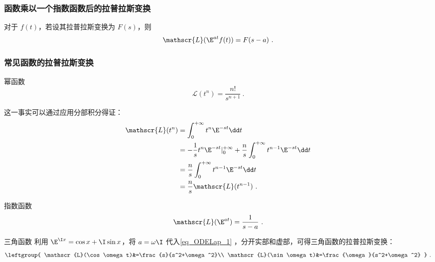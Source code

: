 \subsubsection{函数乘以一个指数函数后的拉普拉斯变换}




\begin{theorem}{}\label{the_ODELap_2}
对于 $f(t)$，若设其拉普拉斯变换为 $F(s)$，则
\begin{equation}
\mathscr{L}(\E^{at}f(t))=F(s-a)~.
\end{equation}
\end{theorem}









\subsubsection{常见函数的拉普拉斯变换}

\begin{example}{幂函数}
\begin{equation}\label{eq_ODELap_11}
\mathscr{L}(t^n)=\frac{n!}{s^{n+1}}~.
\end{equation}

这一事实可以通过应用分部积分得证：
\begin{equation}\label{eq_ODELap_2}
\begin{aligned}
\mathscr{L}(t^n)&=\int_0^{+\infty}t^n\E^{-st}\dd t\\
&=-\frac{1}{s}t^n\E^{-st}|^{+\infty}_0+\frac{n}{s}\int_0^{+\infty}t^{n-1}\E^{-st}\dd t\\
&=\frac{n}{s}\int_0^{+\infty}t^{n-1}\E^{-st}\dd t\\
&=\frac{n}{s}\mathscr{L}(t^{n-1})~.
\end{aligned}
\end{equation}
\end{example}

\begin{example}{指数函数}
\begin{equation}\label{eq_ODELap_1}
\mathscr{L}(\E^{at})=\frac{1}{s-a}~.
\end{equation}

\end{example}

\begin{example}{三角函数}
利用 $\E^{\I x}=\cos x+\I\sin x$，将 $a=\omega\I$ 代入\autoref{eq_ODELap_1} ，分开实部和虚部，可得三角函数的拉普拉斯变换：
\begin{equation}\label{eq_ODELap_3}
\leftgroup{
    \mathscr{L}(\cos \omega t)&=\frac{s}{s^2+\omega^2}\\
    \mathscr{L}(\sin \omega t)&=\frac{\omega}{s^2+\omega^2}
}~.
\end{equation}
\end{example}


